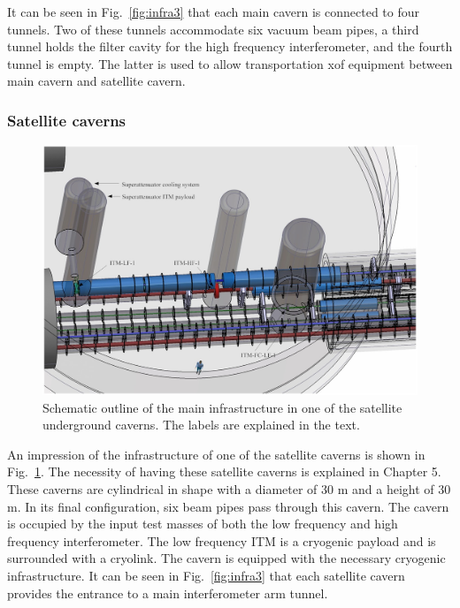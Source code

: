 It can be seen in Fig.~\ref{fig:infra3} that each main cavern is connected to four tunnels. Two of these tunnels accommodate six vacuum beam pipes, a third tunnel holds the filter cavity for the high frequency interferometer, and the fourth tunnel is empty. The latter is used to allow transportation xof equipment between main cavern and satellite cavern.

\FloatBarrier
\subsubsection*{Satellite caverns}

\begin{figure}[htbp!]
\centering
\includegraphics[width=16cm]{./Sec_SiteInfra/Figures/infra4.jpg}
\caption{Schematic outline of the main infrastructure in one of the satellite underground caverns.
The labels are explained in the text.}
\label{fig:infra4}
\end{figure}

An impression of the infrastructure of one of the satellite caverns is shown in Fig.~\ref{fig:infra4}. The necessity of having these satellite caverns is explained in Chapter 5. These caverns are cylindrical in shape with a diameter of 30 m and a height of 30 m. In its final configuration, six beam pipes pass through this cavern. The cavern is occupied by the input test masses of both the low frequency and high frequency interferometer. The low frequency ITM is a cryogenic payload and is surrounded with a cryolink. The cavern is equipped with the necessary cryogenic infrastructure. It can be seen in Fig.~\ref{fig:infra3} that each satellite cavern provides the entrance to a main interferometer arm tunnel.

